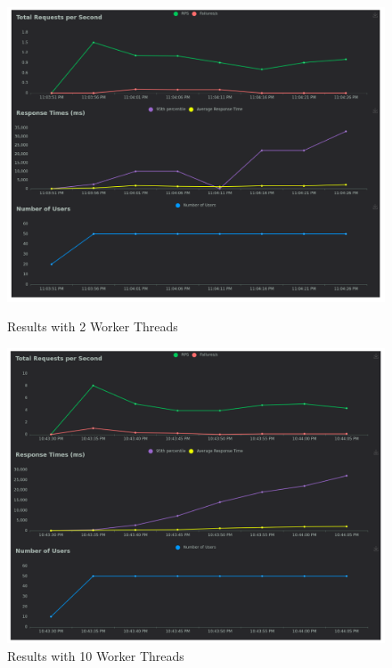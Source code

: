 \begin{figure}[h]
    \centering
    \begin{minipage}{0.45\textwidth}
        \centering
        \includegraphics[width=\textwidth]{figures/report_2_threads.png}
        \caption{Results with 2 Worker Threads}
    \end{minipage}
    \hfill
    \begin{minipage}{0.45\textwidth}
        \centering
        \includegraphics[width=\textwidth]{figures/report_10_threads.png}
        \caption{Results with 10 Worker Threads}
    \end{minipage}
\end{figure}


